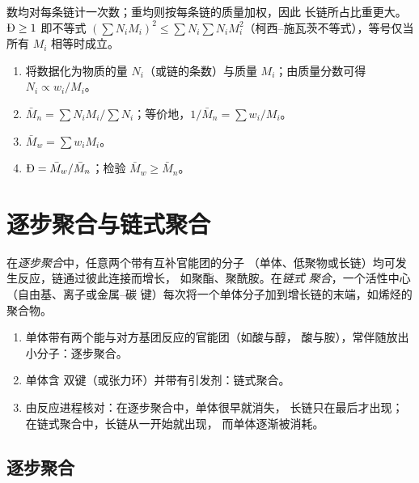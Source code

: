 数均对每条链计一次数；重均则按每条链的质量加权，因此
长链所占比重更大。$\text{\DH} \ge 1$ 即不等式 $\left(\sum N_i M_i\right)^2 \le
\sum N_i \sum N_i M_i^2$（柯西–施瓦茨不等式），等号仅当所有 $M_i$ 相等时成立。

\begin{method}[计算平均值]\label{met:b2:polymer-synthesis:averages}
\begin{enumerate}
  \item 将数据化为物质的量 $N_i$（或链的条数）与质量 $M_i$；由质量分数可得
        $N_i \propto w_i/M_i$。
  \item $\bar M_n = \sum N_i M_i / \sum N_i$；等价地，$1/\bar M_n = \sum w_i/M_i$。
  \item $\bar M_w = \sum w_i M_i$。
  \item $\text{\DH} = \bar M_w/\bar M_n$；检验 $\bar M_w \ge \bar M_n$。
\end{enumerate}
\end{method}

\section{逐步聚合与链式聚合}

\begin{definition}[逐步聚合与链式聚合]\label{def:b2:polymer-synthesis:step-chain}
在\emph{逐步聚合}中，任意两个带有互补官能团的分子
（单体、低聚物或长链）均可发生反应，链通过彼此连接而增长，
如聚酯、聚酰胺。在\emph{链式
聚合}，一个活性中心（自由基、离子或金属–碳
键）每次将一个单体分子加到增长链的末端，如烯烃的聚合物。
\end{definition}

\begin{method}[逐步还是链式？]\label{met:b2:polymer-synthesis:classify}
\begin{enumerate}
  \item 单体带有两个能与对方基团反应的官能团（如酸与醇，
        酸与胺），常伴随放出小分子：逐步聚合。
  \item 单体含  双键（或张力环）并带有引发剂：链式聚合。
  \item 由反应进程核对：在逐步聚合中，单体很早就消失，
        长链只在最后才出现；在链式聚合中，长链从一开始就出现，
        而单体逐渐被消耗。
\end{enumerate}
\end{method}

\subsection*{逐步聚合}

